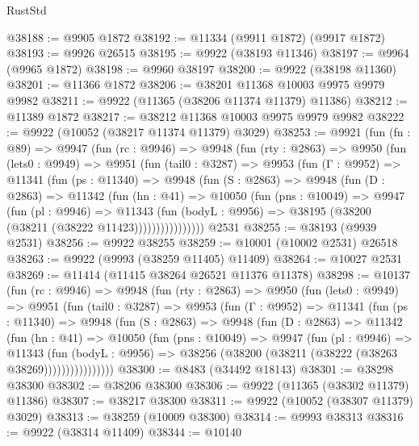 \begin{lexlean}{RustStd}
\begin{coremodule}
@38188 := @9905 @1872
@38192 := @11334 (@9911 @1872) (@9917 @1872)
@38193 := @9926 @26515
@38195 := @9922 (@38193 @11346)
@38197 := @9964 (@9965 @1872)
@38198 := @9960 @38197
@38200 := @9922 (@38198 @11360)
@38201 := @11366 @1872
@38206 := @38201 @11368 @10003 @9975 @9979 @9982
@38211 := @9922 (@11365 (@38206 @11374 @11379) @11386)
@38212 := @11389 @1872
@38217 := @38212 @11368 @10003 @9975 @9979 @9982
@38222 := @9922 (@10052 (@38217 @11374 @11379) @3029)
@38253 := @9921
    (fun (fn : @89) =>
    @9947
      (fun (rc : @9946) =>
      @9948
        (fun (rty : @2863) =>
        @9950
          (fun (lets0 : @9949) =>
          @9951
            (fun (tail0 : @3287) =>
            @9953
              (fun (Γ : @9952) =>
              @11341
                (fun (ps : @11340) =>
                @9948
                  (fun (S : @2863) =>
                  @9948
                    (fun (D : @2863) =>
                    @11342
                      (fun (hn : @41) =>
                      @10050
                        (fun (pns : @10049) =>
                        @9947
                          (fun (pl : @9946) =>
                          @11343
                            (fun (bodyL : @9956) =>
                            @38195 (@38200 (@38211 (@38222 @11423))))))))))))))))
    @2531
@38255 := @38193 (@9939 @2531)
@38256 := @9922 @38255
@38259 := @10001 (@10002 @2531) @26518
@38263 := @9922 (@9993 (@38259 @11405) @11409)
@38264 := @10027 @2531
@38269 := @11414 (@11415 @38264 @26521 @11376 @11378)
@38298 := @10137
    (fun (rc : @9946) =>
    @9948
      (fun (rty : @2863) =>
      @9950
        (fun (lets0 : @9949) =>
        @9951
          (fun (tail0 : @3287) =>
          @9953
            (fun (Γ : @9952) =>
            @11341
              (fun (ps : @11340) =>
              @9948
                (fun (S : @2863) =>
                @9948
                  (fun (D : @2863) =>
                  @11342
                    (fun (hn : @41) =>
                    @10050
                      (fun (pns : @10049) =>
                      @9947
                        (fun (pl : @9946) =>
                        @11343
                          (fun (bodyL : @9956) =>
                          @38256 (@38200 (@38211 (@38222 (@38263 @38269))))))))))))))))
@38300 := @8483 (@34492 @18143)
@38301 := @38298 @38300
@38302 := @38206 @38300
@38306 := @9922 (@11365 (@38302 @11379) @11386)
@38307 := @38217 @38300
@38311 := @9922 (@10052 (@38307 @11379) @3029)
@38313 := @38259 (@10009 @38300)
@38314 := @9993 @38313
@38316 := @9922 (@38314 @11409)
@38344 := @10140

\end{coremodule}
\end{lexlean}
